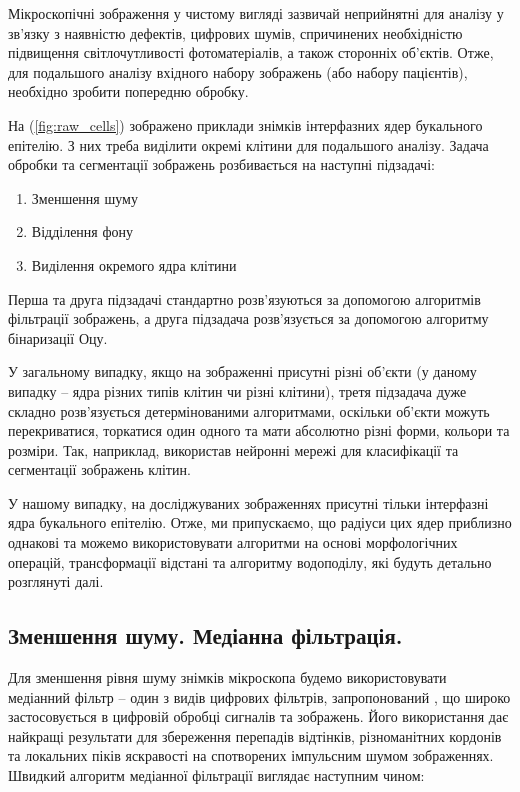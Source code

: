 \par
Мікроскопічні зображення у чистому вигляді зазвичай неприйнятні для аналізу у зв’язку з наявністю дефектів, цифрових шумів, спричинених необхідністю підвищення світлочутливості фотоматеріалів, а також сторонніх об’єктів. Отже, для подальшого аналізу вхідного набору зображень (або набору пацієнтів), необхідно зробити попередню обробку.

\par
На (\ref{fig:raw_cells}) зображено приклади знімків інтерфазних ядер букального епітелію. З них треба виділити окремі клітини для подальшого аналізу. Задача обробки та сегментації зображень розбивається на наступні підзадачі:

\begin{enumerate}
	\item Зменшення шуму
	\item Відділення фону
	\item Виділення окремого ядра клітини
\end{enumerate}

\par
Перша та друга підзадачі стандартно розв’язуються за допомогою алгоритмів фільтрації зображень, а друга підзадача розв’язується за допомогою алгоритму бінаризації Оцу. 

У загальному випадку, якщо на зображенні присутні різні об'єкти (у даному випадку -- ядра різних типів клітин чи різні клітини), третя підзадача дуже складно розв’язується детермінованими алгоритмами, оскільки об'єкти можуть перекриватися, торкатися один одного та мати абсолютно різні форми, кольори та розміри. Так, наприклад, \parencite{bib:cellcount} використав нейронні мережі для класифікації та сегментації зображень клітин.

У нашому випадку, на досліджуваних зображеннях присутні тільки інтерфазні ядра букального епітелію. Отже, ми припускаємо, що радіуси цих ядер приблизно однакові та можемо використовувати алгоритми на основі морфологічних операцій, трансформації відстані та алгоритму водоподілу, які будуть детально розглянуті далі.

\subsection{Зменшення шуму. Медіанна фільтрація.}

Для зменшення рівня шуму знімків мікроскопа будемо використовувати медіанний фільтр -- один з видів цифрових фільтрів, запропонований \citep{bib:medianfilter}, що широко застосовується в цифровій обробці сигналів та зображень. Його використання дає найкращі результати для збереження перепадів відтінків, різноманітних кордонів та локальних піків яскравості на спотворених імпульсним шумом зображеннях. Швидкий алгоритм медіанної фільтрації виглядає наступним чином:


